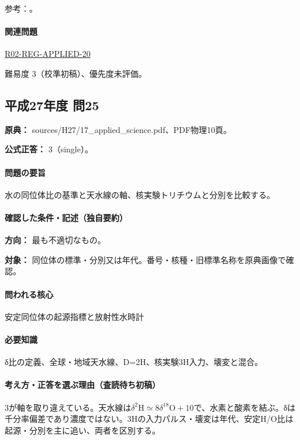 \par 参考：\cite{iso_standards1995,iso_oxygen,iso_deadcarbon,iso_hydrothermal}。

\paragraph{関連問題} \hyperref[q:r02-reg-applied-20]{R02-REG-APPLIED-20}

\par 難易度 3（校準初稿）、優先度未評価。

\subsection{平成27年度 問25}
\label{q:h27-reg-applied-25}

\noindent\textbf{原典：} sources/H27/17\_applied\_science.pdf、PDF物理10頁。

\textbf{公式正答：} 3（single）。

\paragraph{問題の要旨} 水の同位体比の基準と天水線の軸、核実験トリチウムと分別を比較する。

\paragraph{確認した条件・記述（独自要約）}\mbox{}\par

\noindent\textbf{方向：} 最も不適切なもの。\par

\noindent\textbf{対象：} 同位体の標準・分別又は年代。番号・核種・旧標準名称を原典画像で確認。\par

\paragraph{問われる核心} 安定同位体の起源指標と放射性水時計

\paragraph{必要知識} δ比の定義、全球・地域天水線、D=\allowbreak{}2H、核実験3H入力、壊変と混合。

\paragraph{考え方・正答を選ぶ理由（査読待ち初稿）} 3が軸を取り違えている。天水線は\(\delta^2\mathrm H\simeq8\delta^{18}\mathrm O+10\)で、水素と酸素を結ぶ。δは千分率偏差であり濃度ではない。3Hの入力パルス・壊変は年代、安定H/O比は起源・分別を主に追い、両者を区別する。

